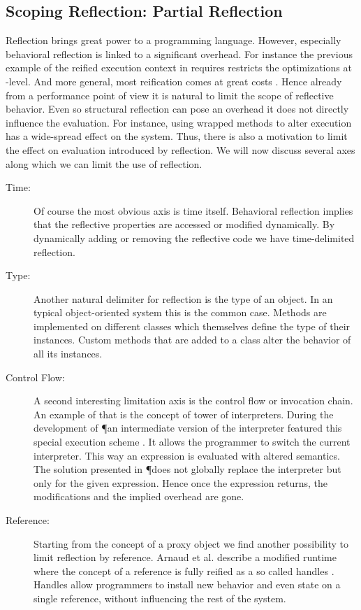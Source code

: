 \subsection{Scoping Reflection: Partial Reflection}
Reflection brings great power to a programming language.
However, especially behavioral reflection is linked to a significant overhead.
For instance the previous example of the reified execution context in \ST requires restricts the optimizations at \VM-level.
And more general, most reification comes at great costs \cite{Male96a}.
Hence already from a performance point of view it is natural to limit the scope of reflective behavior.
Even so structural reflection can pose an overhead it does not directly influence the evaluation.
For instance, using wrapped methods to alter execution has a wide-spread effect on the system.
Thus, there is also a motivation to limit the effect on evaluation introduced by reflection.
We will now discuss several axes along which we can limit the use of reflection.
%
\begin{description}
\item[Time:] Of course the most obvious axis is time itself.
	Behavioral reflection implies that the reflective properties are accessed or modified dynamically.
	By dynamically adding or removing the reflective code we have time-delimited reflection.
	
\item[Type:] Another natural delimiter for reflection is the type of an object.
	In an typical object-oriented system this is the common case.
	Methods are implemented on different classes which themselves define the type of their instances. 
	Custom methods that are added to a class alter the behavior of all its instances.

\item[Control Flow:] A second interesting limitation axis is the control flow or invocation chain.
	An example of that is the concept of tower of interpreters.
	During the development of \P an intermediate version of the \ST interpreter featured this special execution scheme \cite{Verw10a}.
	It allows the programmer to switch the current interpreter.
	This way an expression is evaluated with altered semantics.
	The solution presented in \P does not globally replace the interpreter but only for the given expression. 
	Hence once the expression returns, the modifications and the implied overhead are gone.

\item[Reference:] Starting from the concept of a proxy object  we find another possibility to limit reflection by reference.
	Arnaud et al. describe a modified \PH runtime where the concept of a reference is fully reified as a so called handles \cite{Arna13a}.
	Handles allow programmers to install new behavior and even state on a single reference, without influencing the rest of the system.	
\end{description}
%


